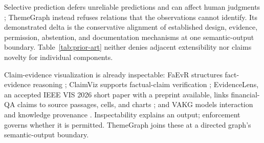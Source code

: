 \documentclass[manuscript,screen,review]{acmart}
\begin{document}
Selective prediction defers unreliable predictions and can affect human judgments \cite{bondi2022}; ThemeGraph instead refuses relations that the observations cannot identify. Its demonstrated delta is the conservative alignment of established design, evidence, permission, abstention, and documentation mechanisms at one semantic-output boundary. Table~\ref{tab:prior-art} neither denies adjacent extensibility nor claims novelty for individual components.

Claim-evidence visualization is already inspectable: FaEvR structures fact-evidence reasoning \cite{vaidya2020}; ClaimViz supports factual-claim verification \cite{rony2020}; EvidenceLens, an accepted IEEE VIS 2026 short paper with a preprint available, links financial-QA claims to source passages, cells, and charts \cite{gu2026}; and VAKG models interaction and knowledge provenance \cite{christino2026}. Inspectability explains an output; enforcement governs whether it is permitted. ThemeGraph joins these at a directed graph's semantic-output boundary.
\end{document}
